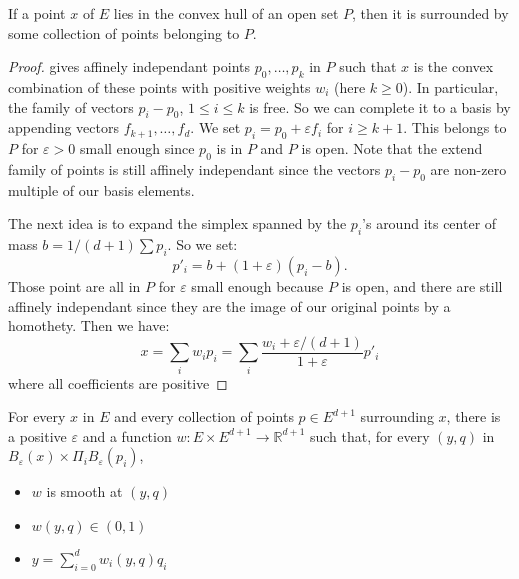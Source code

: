 \begin{lemma}
  \label{lem:int_cvx}
  If a point $x$ of $E$ lies in the convex hull of an open set $P$,
  then it is surrounded by some collection of points belonging to $P$.
\end{lemma}

\begin{proof}
   gives affinely independant points
  $p_0, \dots, p_k$ in $P$ such that $x$ is the convex combination of
  these points with positive weights $w_i$ (here $k \ge 0$).
  In particular, the family of vectors $p_i - p_0$, $1 ≤ i ≤ k$ is free.
  So we can complete it to a basis by appending vectors
  $f_{k+1}, \dots, f_d$.
  We set $p_i = p_0 + εf_i$ for $i \ge k+1$.
  This belongs to $P$ for $ε > 0$ small enough since $p_0$ is in $P$
  and $P$ is open.
  Note that the extend family of points is still affinely independant
  since the vectors $p_i - p_0$ are non-zero multiple of our basis
  elements.

  The next idea is to expand the simplex spanned by the $p_i$'s around its
  center of mass $b = 1/(d+1)\sum p_i$. So we set:
  \[
    p'_i = b + (1 + ε)(p_i - b).
  \]
  Those point are all in $P$ for $ε$ small enough because $P$ is open,
  and there are still affinely independant since they are the image of
  our original points by a homothety.
  Then we have:
  \[
    x = \sum_i w_i p_i = \sum_i \frac{w_i + ε/(d+1)}{1 + ε} p'_i
  \]
  where all coefficients are positive
\end{proof}


\begin{lemma}
  \label{lem:smooth_convex_hull}
  For every $x$ in $E$ and every collection of points $p ∈ E^{d+1}$
  surrounding $x$, there is a positive $ε$ and a function
  $w : E × E^{d+1} → ℝ^{d+1}$ such that, for every
  $(y, q)$ in $B_ε(x) × Π_i B_ε(p_i)$,
  \begin{itemize}
    \item
      $w$ is smooth at $(y, q)$
    \item
      $w(y, q) ∈ (0, 1)$
    \item
      $y = \sum_{i=0}^d w_i(y, q)q_i$
  \end{itemize}
\end{lemma}

